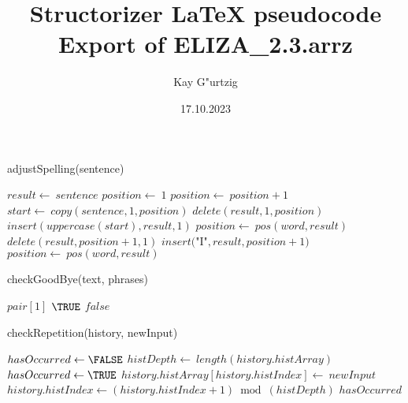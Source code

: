 \documentclass[a4paper,10pt]{article}
\title{Structorizer LaTeX pseudocode Export of ELIZA\_2.3.arrz}
\author{Kay G"urtzig}
\date{17.10.2023}
\begin{document}
\begin{algorithm}
\caption{adjustSpelling(sentence)}
\begin{algorithmic}[5]

\STATE {}
  \STATE \(result\gets\ sentence\)
  \STATE \(position\gets\ 1\)
    \STATE \(position\gets\ position+1\)
  \ENDWHILE
    \STATE \(start\gets\ copy(sentence,1,position)\)
    \STATE \(delete(result,1,position)\)
    \STATE \(insert(uppercase(start),result,1)\)
  \ENDIF
    \STATE \(position\gets\ pos(word,result)\)
      \STATE \(delete(result,position+1,1)\)
      \STATE \(insert(\)"{}I"{}\(,result,position+1)\)
      \STATE \(position\gets\ pos(word,result)\)
    \ENDWHILE
  \ENDFOR

\end{algorithmic}
\end{algorithm}


\begin{algorithm}
\caption{checkGoodBye(text, phrases)}
\begin{algorithmic}[5]

\STATE {}
\STATE {}
\STATE {}
\STATE {}
      \PRINT\(pair[1]\)
      \RETURN\(\TRUE\)
    \ENDIF
  \ENDFOR
  \RETURN\(false\)

\end{algorithmic}
\end{algorithm}


\begin{algorithm}
\caption{checkRepetition(history, newInput)}
\begin{algorithmic}[5]

\STATE {}
\STATE {}
  \STATE \(hasOccurred\gets\FALSE\)
    \STATE \(histDepth\gets\ length(history.histArray)\)
        \STATE \(hasOccurred\gets\TRUE\)
      \ENDIF
    \ENDFOR
    \STATE \(history.histArray[history.histIndex]\gets\ newInput\)
    \STATE \(history.histIndex\gets(history.histIndex+1)\bmod(histDepth)\)
  \ENDIF
  \RETURN\(hasOccurred\)

\end{algorithmic}
\end{algorithm}
\end{document}
